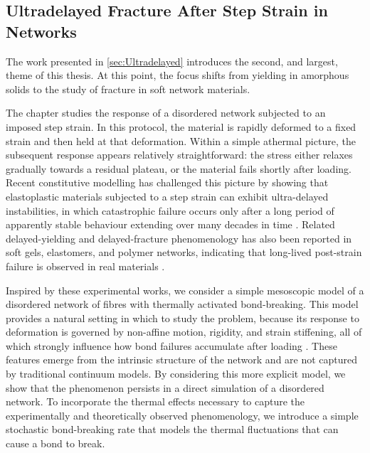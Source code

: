 \subsection*{Ultradelayed Fracture After Step Strain in Networks}
The work presented in \cref{sec:Ultradelayed} introduces the second, and largest, theme of this thesis. At this point, the focus shifts from yielding in amorphous solids to the study of fracture in soft network materials. 

The chapter studies the response of a disordered network subjected to an imposed step strain. In this protocol, the material is rapidly deformed to a fixed strain and then held at that deformation. Within a simple athermal picture, the subsequent response appears relatively straightforward: the stress either relaxes gradually towards a residual plateau, or the material fails shortly after loading. Recent constitutive modelling has challenged this picture by showing that elastoplastic materials subjected to a step strain can exhibit ultra-delayed instabilities, in which catastrophic failure occurs only after a long period of apparently stable behaviour extending over many decades in time \cite{lockwood_ultradelayed_2025}. Related delayed-yielding and delayed-fracture phenomenology has also been reported in soft gels, elastomers, and polymer networks, indicating that long-lived post-strain failure is observed in real materials \cite{sprakel_stress_2011,blindstrom_structures_2012,van_der_kooij_laser_2018,wangDelayedFractureGels2012,Ju2023}.

Inspired by these experimental works, we consider a simple mesoscopic model of a disordered network of fibres with thermally activated bond-breaking. This model provides a natural setting in which to study the problem, because its response to deformation is governed by non-affine motion, rigidity, and strain stiffening, all of which strongly influence how bond failures accumulate after loading \cite{shivers_strain-controlled_2023}. These features emerge from the intrinsic structure of the network and are not captured by traditional continuum models. By considering this more explicit model, we show that the phenomenon persists in a direct simulation of a disordered network. To incorporate the thermal effects necessary to capture the experimentally and theoretically observed phenomenology, we introduce a simple stochastic bond-breaking rate that models the thermal fluctuations that can cause a bond to break.

